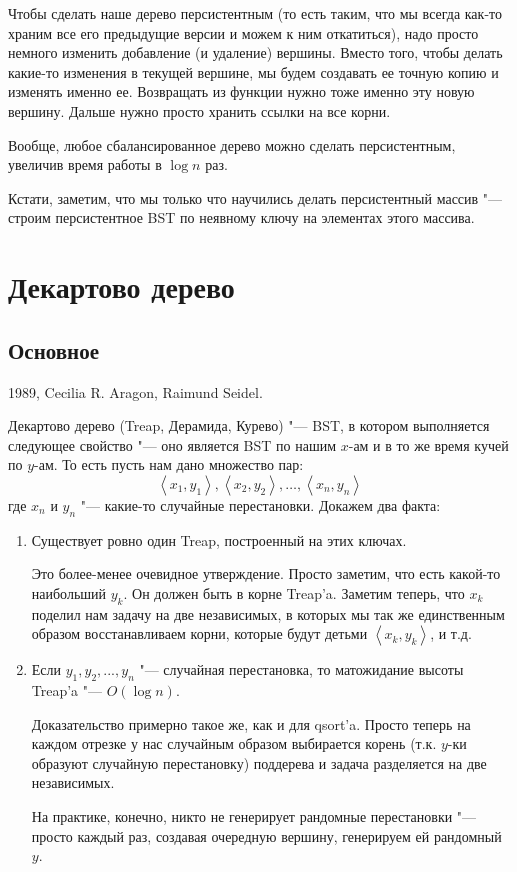 Чтобы сделать наше дерево персистентным (то есть таким, что мы всегда как-то храним все его предыдущие версии и можем к ним откатиться),
надо просто немного изменить добавление (и удаление) вершины.
Вместо того, чтобы делать какие-то изменения в текущей вершине, мы будем создавать ее точную копию и изменять именно ее.
Возвращать из функции нужно тоже именно эту новую вершину.
Дальше нужно просто хранить ссылки на все корни.

Вообще, любое сбалансированное дерево можно сделать персистентным, увеличив время работы в $\log n$ раз.

Кстати, заметим, что мы только что научились делать персистентный массив "--- строим персистентное BST по неявному ключу
на элементах этого массива.

\section{Декартово дерево}

\subsection{Основное}

1989, Cecilia R. Aragon, Raimund Seidel.

Декартово дерево (Treap, Дерамида, Курево) "--- BST, в котором выполняется следующее свойство "--- оно является BST по нашим $x$-ам
и в то же время кучей по $y$-ам.
То есть пусть нам дано множество пар:
\[ \left<x_1, y_1\right>, \left<x_2, y_2\right>, \dots, \left<x_n, y_n\right> \]
где $x_n$ и $y_n$ "--- какие-то случайные перестановки. Докажем два факта:
\begin{enumerate}
\item
	Существует ровно один Treap, построенный на этих ключах.

	Это более-менее очевидное утверждение.
	Просто заметим, что есть какой-то наибольший $y_k$. Он должен быть в корне Treap'a.
	Заметим теперь, что $x_k$ поделил нам задачу на две независимых, в которых
	мы так же единственным образом восстанавливаем корни, которые будут
	детьми $\left<x_k, y_k\right>$, и т.д.

\item
	Если $y_1, y_2, ..., y_n$ "--- случайная перестановка, то матожидание высоты Treap'a "--- $O(\log n)$.

	Доказательство примерно такое же, как и для qsort'a.
	Просто теперь на каждом отрезке у нас случайным образом выбирается корень
	(т.к. $y$-ки образуют случайную перестановку) поддерева и задача разделяется на две независимых.

	На практике, конечно, никто не генерирует рандомные перестановки "--- просто каждый раз,
	создавая очередную вершину, генерируем ей рандомный $y$.
\end{enumerate}

